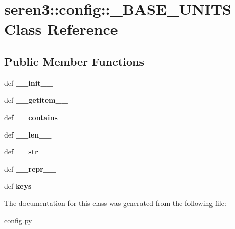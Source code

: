 \hypertarget{classseren3_1_1config_1_1__BASE__UNITS}{
\section{seren3::config::\_\-BASE\_\-UNITS Class Reference}
\label{classseren3_1_1config_1_1__BASE__UNITS}
}
\subsection*{Public Member Functions}
\begin{DoxyCompactItemize}
\item 
\hypertarget{classseren3_1_1config_1_1__BASE__UNITS_ad6aad144e5a5107263dd462ce7f8ba6f}{
def {\bfseries \_\-\_\-init\_\-\_\-}}
\label{classseren3_1_1config_1_1__BASE__UNITS_ad6aad144e5a5107263dd462ce7f8ba6f}

\item 
\hypertarget{classseren3_1_1config_1_1__BASE__UNITS_a6fcad40598f7d677682b71cc692b8ea8}{
def {\bfseries \_\-\_\-getitem\_\-\_\-}}
\label{classseren3_1_1config_1_1__BASE__UNITS_a6fcad40598f7d677682b71cc692b8ea8}

\item 
\hypertarget{classseren3_1_1config_1_1__BASE__UNITS_af47dee09c5271bd61fbd0962e3a779c4}{
def {\bfseries \_\-\_\-contains\_\-\_\-}}
\label{classseren3_1_1config_1_1__BASE__UNITS_af47dee09c5271bd61fbd0962e3a779c4}

\item 
\hypertarget{classseren3_1_1config_1_1__BASE__UNITS_a9e29e60d540982337e86f864f7ee21cd}{
def {\bfseries \_\-\_\-len\_\-\_\-}}
\label{classseren3_1_1config_1_1__BASE__UNITS_a9e29e60d540982337e86f864f7ee21cd}

\item 
\hypertarget{classseren3_1_1config_1_1__BASE__UNITS_a60876d304825840251be85093ab56abe}{
def {\bfseries \_\-\_\-str\_\-\_\-}}
\label{classseren3_1_1config_1_1__BASE__UNITS_a60876d304825840251be85093ab56abe}

\item 
\hypertarget{classseren3_1_1config_1_1__BASE__UNITS_a61d20b39cbdd5e08acf6ec7538c8eda7}{
def {\bfseries \_\-\_\-repr\_\-\_\-}}
\label{classseren3_1_1config_1_1__BASE__UNITS_a61d20b39cbdd5e08acf6ec7538c8eda7}

\item 
\hypertarget{classseren3_1_1config_1_1__BASE__UNITS_a9ba5da3044868d3a22780815cab1297f}{
def {\bfseries keys}}
\label{classseren3_1_1config_1_1__BASE__UNITS_a9ba5da3044868d3a22780815cab1297f}

\end{DoxyCompactItemize}


The documentation for this class was generated from the following file:\begin{DoxyCompactItemize}
\item 
config.py\end{DoxyCompactItemize}
